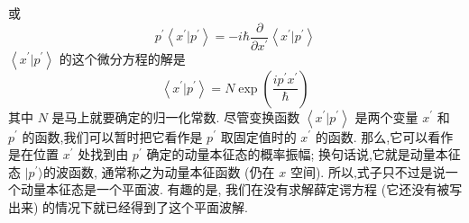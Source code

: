 \documentclass[lang=cn,newtx,10pt,scheme=chinese,thmcnt=section]{elegantbook}
\begin{document}
或
\begin{equation}
	{p}^{\prime }\left\langle {{x}^{\prime } | {p}^{\prime }}\right\rangle = - i\hbar \frac{\partial }{\partial {x}^{\prime }}\left\langle {{x}^{\prime } | {p}^{\prime }}\right\rangle
\end{equation}
$\left\langle {{x}^{\prime } | {p}^{\prime }}\right\rangle$ 的这个微分方程的解是
\begin{equation}
	\left\langle {{x}^{\prime } | {p}^{\prime }}\right\rangle = N\exp \left( \frac{i{p}^{\prime }{x}^{\prime }}{\hbar }\right)
\end{equation}
其中 $N$ 是马上就要确定的归一化常数. 尽管变换函数 $\left\langle {{x}^{\prime } | {p}^{\prime }}\right\rangle$ 是两个变量 ${x}^{\prime }$ 和 ${p}^{\prime }$ 的函数,我们可以暂时把它看作是 ${p}^{\prime }$ 取固定值时的 ${x}^{\prime }$ 的函数. 那么,它可以看作是在位置 ${x}^{\prime }$ 处找到由 ${p}^{\prime }$ 确定的动量本征态的概率振幅; 换句话说,它就是动量本征态 $|{p}^{\prime }\rangle$的波函数, 通常称之为动量本征函数 (仍在 $x$ 空间). 所以,式子只不过是说一个动量本征态是一个平面波. 有趣的是, 我们在没有求解薛定谔方程 (它还没有被写出来) 的情况下就已经得到了这个平面波解.
\end{document}
